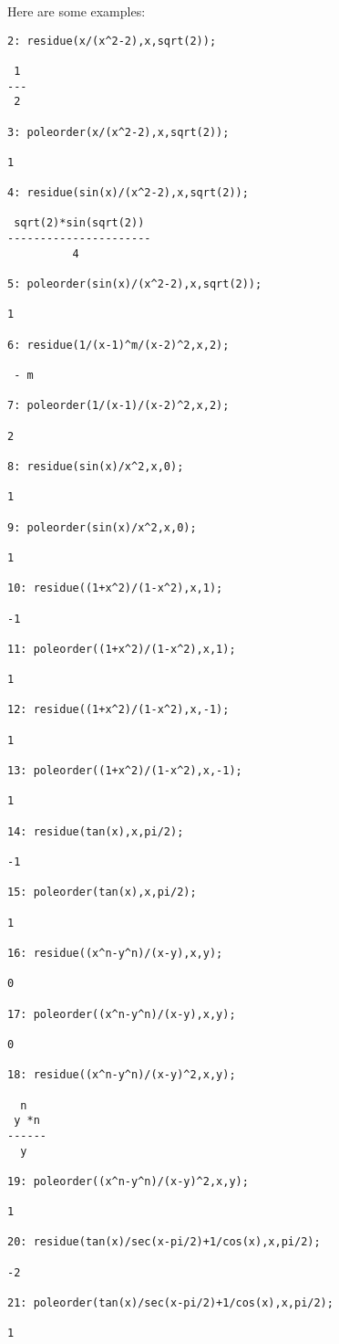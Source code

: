 Here are some examples:
\begin{small}
\begin{verbatim}
2: residue(x/(x^2-2),x,sqrt(2));

 1
---
 2

3: poleorder(x/(x^2-2),x,sqrt(2));

1

4: residue(sin(x)/(x^2-2),x,sqrt(2));

 sqrt(2)*sin(sqrt(2))
----------------------
          4

5: poleorder(sin(x)/(x^2-2),x,sqrt(2));

1

6: residue(1/(x-1)^m/(x-2)^2,x,2);

 - m

7: poleorder(1/(x-1)/(x-2)^2,x,2);

2

8: residue(sin(x)/x^2,x,0);

1

9: poleorder(sin(x)/x^2,x,0);

1

10: residue((1+x^2)/(1-x^2),x,1);

-1

11: poleorder((1+x^2)/(1-x^2),x,1);

1

12: residue((1+x^2)/(1-x^2),x,-1);

1

13: poleorder((1+x^2)/(1-x^2),x,-1);

1

14: residue(tan(x),x,pi/2);

-1

15: poleorder(tan(x),x,pi/2);

1

16: residue((x^n-y^n)/(x-y),x,y);

0

17: poleorder((x^n-y^n)/(x-y),x,y);

0

18: residue((x^n-y^n)/(x-y)^2,x,y);

  n
 y *n
------
  y

19: poleorder((x^n-y^n)/(x-y)^2,x,y);

1

20: residue(tan(x)/sec(x-pi/2)+1/cos(x),x,pi/2);

-2

21: poleorder(tan(x)/sec(x-pi/2)+1/cos(x),x,pi/2);

1


\end{verbatim}
\end{small}

